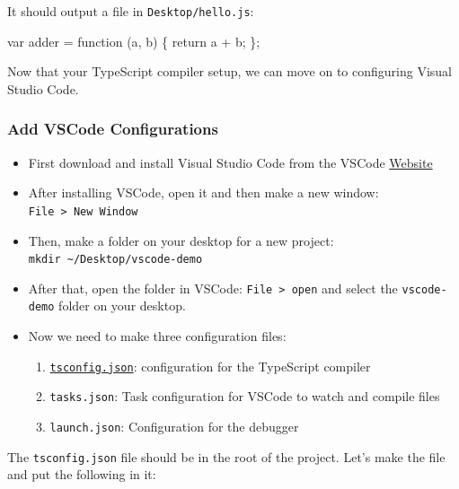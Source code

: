 \documentclass[12pt,]{article}
\newenvironment{Shaded}{}{}
\newcommand{\KeywordTok}[1]{\textcolor[rgb]{0.00,0.00,1.00}{{#1}}}
\newcommand{\ControlFlowTok}[1]{\textcolor[rgb]{0.00,0.00,1.00}{{#1}}}
\newcommand{\OperatorTok}[1]{{#1}}
\newcommand{\NormalTok}[1]{{#1}}
\providecommand{\tightlist}{%
  \setlength{\itemsep}{0pt}\setlength{\parskip}{0pt}}
\begin{document}
It should output a file in \texttt{Desktop/hello.js}:

\begin{Shaded}
\begin{Highlighting}[numbers=left,,]
\KeywordTok{var} \NormalTok{adder }\OperatorTok{=} \KeywordTok{function} \NormalTok{(a}\OperatorTok{,} \NormalTok{b) }\OperatorTok{\{} \ControlFlowTok{return} \NormalTok{a }\OperatorTok{+} \NormalTok{b}\OperatorTok{;} \OperatorTok{\};}
\end{Highlighting}
\end{Shaded}

Now that your TypeScript compiler setup, we can move on to configuring
Visual Studio Code.

\subsubsection{Add VSCode
Configurations}\label{add-vscode-configurations}

\begin{itemize}
\item
  First download and install Visual Studio Code from the VSCode
  \href{https://code.visualstudio.com/}{Website}
\item
  After installing VSCode, open it and then make a new window:
  \texttt{File\ \textgreater{}\ New\ Window}
\item
  Then, make a folder on your desktop for a new project:
  \texttt{mkdir\ \textasciitilde{}/Desktop/vscode-demo}
\item
  After that, open the folder in VSCode:
  \texttt{File\ \textgreater{}\ open} and select the
  \texttt{vscode-demo} folder on your desktop.
\item
  Now we need to make three configuration files:

  \begin{enumerate}
  \def\labelenumi{\arabic{enumi}.}
  \tightlist
  \item
    \href{http://json.schemastore.org/tsconfig}{\texttt{tsconfig.json}}:
    configuration for the TypeScript compiler
  \item
    \texttt{tasks.json}: Task configuration for VSCode to watch and
    compile files
  \item
    \texttt{launch.json}: Configuration for the debugger
  \end{enumerate}
\end{itemize}

The \texttt{tsconfig.json} file should be in the root of the project.
Let's make the file and put the following in it:
\end{document}
